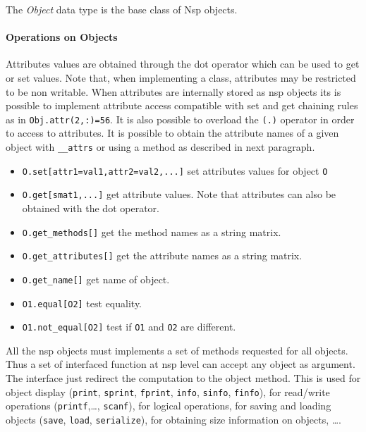 
\begin{mandesc}
\end{mandesc}

\begin{mandescription}
The \emph{Object} data type is the base class of Nsp objects. 
\end{mandescription}

\paragraph{Operations on Objects}
Attributes values are obtained through the dot operator which can be used to get or set 
values. Note that, when implementing a class, attributes may be restricted to be non writable.
When attributes are internally stored as nsp objects its is possible to implement attribute 
access compatible with set and get chaining rules as in \verb+Obj.attr(2,:)=56+. It is also 
possible to overload the \verb+(.)+ operator in order to access to attributes. 
It is possible to obtain the attribute names of a given object with \verb+__attrs+ or using 
a method as described in next paragraph.
\begin{itemize}
\item \verb+O.set[attr1=val1,attr2=val2,...]+  set attributes values for object \verb+O+ 
\item \verb+O.get[smat1,...]+ get attribute values. Note that attributes can also be obtained with the dot 
  operator.
\item \verb+O.get_methods[]+ get the method names as a string matrix.
\item \verb+O.get_attributes[]+ get the attribute names as a string matrix.
\item \verb+O.get_name[]+ get name of object. 
\item \verb+O1.equal[O2]+ test equality. 
\item \verb+O1.not_equal[O2]+ test if \verb!O1! and \verb!O2! are different.
\end{itemize}

All the nsp objects must implements a set of methods requested for all objects. 
Thus a set of interfaced function at nsp level can accept any object as argument. 
The interface just redirect the computation to the object method. 
This is used for object display (\verb+print+, \verb+sprint+, \verb+fprint+, 
\verb+info+, \verb+sinfo+, \verb+finfo+), for read/write operations (\verb+printf+,\ldots, 
\verb+scanf+), for logical operations, for saving and loading objects (\verb+save+, \verb+load+, 
\verb+serialize+), for obtaining size information on objects, \ldots.

